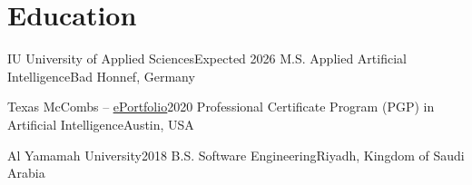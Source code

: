 \section{Education}
    \resumeSubHeadingListStart

    \resumeSubheading
    {IU University of Applied Sciences}{Expected 2026}
    {M.S. Applied Artificial Intelligence}{Bad Honnef, Germany}

    \resumeSubheading
    {Texas McCombs -- \href{https://eportfolio.mygreatlearning.com/khalid-hamad-al-subaie}{\underline{ePortfolio}}}{2020}
    {Professional Certificate Program (PGP) in Artificial Intelligence}{Austin, USA}

    \resumeSubheading
    {Al Yamamah University}{2018}
    {B.S. Software Engineering}{Riyadh, Kingdom of Saudi Arabia}

    \resumeSubHeadingListEnd
